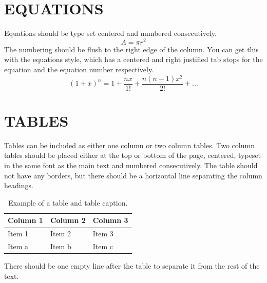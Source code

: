 \documentclass{cfm_paper} %
\begin{document}
\section*{EQUATIONS}
Equations should be type set centered and numbered consecutively.
\begin{equation} %
    A = \pi r^2
\end{equation}
The numbering should be flush to the right edge of the column. You can get this with the equations style, which has a centered and right justified tab stops for the equation and the equation number respectively.
\begin{equation}
    (1+x)^n = 1 + \frac{nx}{1!}+\frac{n(n-1)x^2}{2!}+...
\end{equation}

\section*{TABLES}
Tables can be included as either one column or two column tables. Two column tables should be placed either at the top or bottom of the page, centered, typeset in the same font as the main text and numbered consecutively. The table should not have any borders, but there should be a horizontal line separating the column headings.


    \begin{table}[h]
\caption{Example of a table and table caption.} %
\label{tab:ExampleTable}
\begin{tabularx}{\columnwidth}{XXX} %
\toprule
Column 1 & Column 2 & Column 3 \\
\midrule %
Item 1   & Item 2   & Item 3   \\
Item a   & Item b   & Item c   \\
\bottomrule
\end{tabularx}
\end{table}

There should be one empty line after the table to separate it from the rest of the text.
\end{document}
